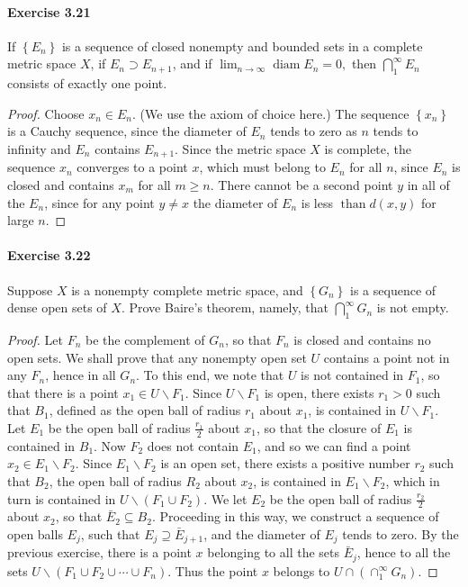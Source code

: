 \documentclass{article}
\theoremstyle{definition}
\begin{document}
\paragraph{Exercise 3.21} If $\left\{E_{n}\right\}$ is a sequence of closed nonempty and bounded sets in a complete metric space $X$, if $E_{n} \supset E_{n+1}$, and if $\lim _{n \rightarrow \infty} \operatorname{diam} E_{n}=0,$ then $\bigcap_{1}^{\infty} E_{n}$ consists of exactly one point.
\begin{proof}
    Choose $x_n \in E_n$. (We use the axiom of choice here.) The sequence $\left\{x_n\right\}$ is a Cauchy sequence, since the diameter of $E_n$ tends to zero as $n$ tends to infinity and $E_n$ contains $E_{n+1}$. Since the metric space $X$ is complete, the sequence $x_n$ converges to a point $x$, which must belong to $E_n$ for all $n$, since $E_n$ is closed and contains $x_m$ for all $m \geq n$. There cannot be a second point $y$ in all of the $E_n$, since for any point $y \neq x$ the diameter of $E_n$ is less $\operatorname{than} d(x, y)$ for large $n$.
\end{proof}


\paragraph{Exercise 3.22} Suppose $X$ is a nonempty complete metric space, and $\left\{G_{n}\right\}$ is a sequence of dense open sets of $X$. Prove Baire's theorem, namely, that $\bigcap_{1}^{\infty} G_{n}$ is not empty.
\begin{proof}
    Let $F_n$ be the complement of $G_n$, so that $F_n$ is closed and contains no open sets. We shall prove that any nonempty open set $U$ contains a point not in any $F_n$, hence in all $G_n$. To this end, we note that $U$ is not contained in $F_1$, so that there is a point $x_1 \in U \backslash F_1$. Since $U \backslash F_1$ is open, there exists $r_1>0$ such that $B_1$, defined as the open ball of radius $r_1$ about $x_1$, is contained in $U \backslash F_1$. Let $E_1$ be the open ball of radius $\frac{r_1}{2}$ about $x_1$, so that the closure of $E_1$ is contained in $B_1$. Now $F_2$ does not contain $E_1$, and so we can find a point $x_2 \in E_1 \backslash F_2$. Since $E_1 \backslash F_2$ is an open set, there exists a positive number $r_2$ such that $B_2$, the open ball of radius $R_2$ about $x_2$, is contained in $E_1 \backslash F_2$, which in turn is contained in $U \backslash\left(F_1 \cup F_2\right)$. We let $E_2$ be the open ball of radius $\frac{r_2}{2}$ about $x_2$, so that $\bar{E}_2 \subseteq B_2$. Proceeding in this way, we construct a sequence of open balls $E_j$, such that $E_j \supseteq \bar{E}_{j+1}$, and the diameter of $E_j$ tends to zero. By the previous exercise, there is a point $x$ belonging to all the sets $\bar{E}_j$, hence to all the sets $U \backslash\left(F_1 \cup F_2 \cup \cdots \cup F_n\right)$. Thus the point $x$ belongs to $U \cap\left(\cap_1^{\infty} G_n\right)$.
\end{proof}
\end{document}
